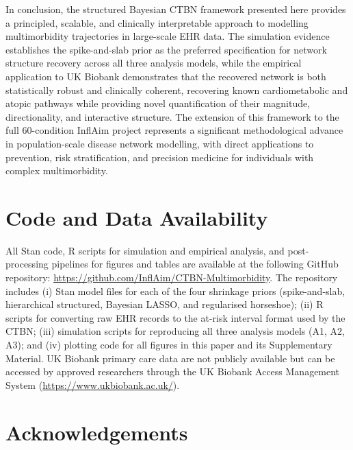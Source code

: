 \documentclass[12pt]{article}
\begin{document}
In conclusion, the structured Bayesian CTBN framework presented here provides a principled, scalable, and clinically interpretable approach to modelling 
multimorbidity trajectories in large-scale EHR data. The simulation evidence establishes the spike-and-slab prior as the preferred specification for network structure recovery across all three analysis models, while the empirical application to UK Biobank demonstrates that the recovered network is both statistically robust and clinically coherent, recovering known cardiometabolic and atopic pathways while providing novel quantification of their magnitude, directionality, and interactive structure. The extension of this framework to the full 60-condition InflAim project represents a significant methodological advance in population-scale disease network modelling, with direct applications to prevention, risk stratification, and precision medicine for individuals with complex multimorbidity.

\section*{Code and Data Availability}

All Stan code, R scripts for simulation and empirical analysis, and post-processing pipelines for figures and tables are available at the following GitHub repository: \url{https://github.com/InflAim/CTBN-Multimorbidity}. The repository includes (i) Stan model files for each of the four shrinkage priors (spike-and-slab, hierarchical structured, Bayesian LASSO, and regularised horseshoe); (ii) R scripts for converting raw EHR records to the at-risk interval format used by the CTBN; (iii) simulation scripts for reproducing all three analysis models (A1, A2, A3); and (iv) plotting code for all figures in this paper and its Supplementary Material. UK Biobank primary care data are not publicly available but can be accessed by approved researchers through the UK Biobank Access Management System (\url{https://www.ukbiobank.ac.uk/}).

\section*{Acknowledgements}
\end{document}

